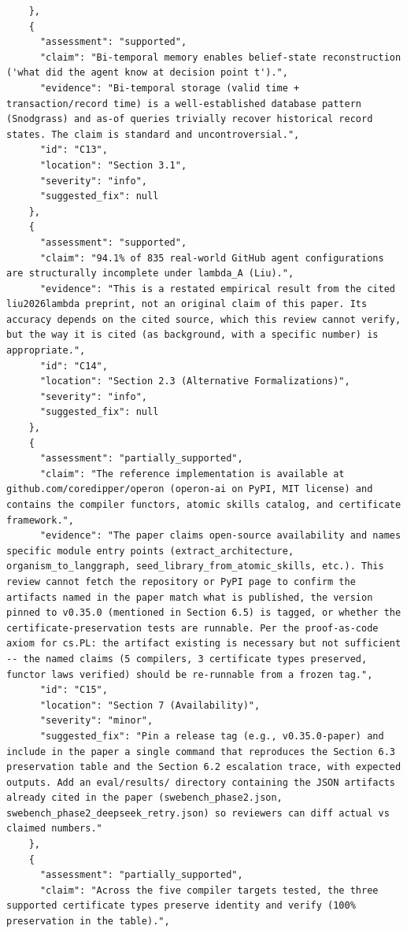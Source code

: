 \documentclass[11pt]{article}
\begin{document}
\begin{verbatim}
    },
    {
      "assessment": "supported",
      "claim": "Bi-temporal memory enables belief-state reconstruction ('what did the agent know at decision point t').",
      "evidence": "Bi-temporal storage (valid time + transaction/record time) is a well-established database pattern (Snodgrass) and as-of queries trivially recover historical record states. The claim is standard and uncontroversial.",
      "id": "C13",
      "location": "Section 3.1",
      "severity": "info",
      "suggested_fix": null
    },
    {
      "assessment": "supported",
      "claim": "94.1% of 835 real-world GitHub agent configurations are structurally incomplete under lambda_A (Liu).",
      "evidence": "This is a restated empirical result from the cited liu2026lambda preprint, not an original claim of this paper. Its accuracy depends on the cited source, which this review cannot verify, but the way it is cited (as background, with a specific number) is appropriate.",
      "id": "C14",
      "location": "Section 2.3 (Alternative Formalizations)",
      "severity": "info",
      "suggested_fix": null
    },
    {
      "assessment": "partially_supported",
      "claim": "The reference implementation is available at github.com/coredipper/operon (operon-ai on PyPI, MIT license) and contains the compiler functors, atomic skills catalog, and certificate framework.",
      "evidence": "The paper claims open-source availability and names specific module entry points (extract_architecture, organism_to_langgraph, seed_library_from_atomic_skills, etc.). This review cannot fetch the repository or PyPI page to confirm the artifacts named in the paper match what is published, the version pinned to v0.35.0 (mentioned in Section 6.5) is tagged, or whether the certificate-preservation tests are runnable. Per the proof-as-code axiom for cs.PL: the artifact existing is necessary but not sufficient -- the named claims (5 compilers, 3 certificate types preserved, functor laws verified) should be re-runnable from a frozen tag.",
      "id": "C15",
      "location": "Section 7 (Availability)",
      "severity": "minor",
      "suggested_fix": "Pin a release tag (e.g., v0.35.0-paper) and include in the paper a single command that reproduces the Section 6.3 preservation table and the Section 6.2 escalation trace, with expected outputs. Add an eval/results/ directory containing the JSON artifacts already cited in the paper (swebench_phase2.json, swebench_phase2_deepseek_retry.json) so reviewers can diff actual vs claimed numbers."
    },
    {
      "assessment": "partially_supported",
      "claim": "Across the five compiler targets tested, the three supported certificate types preserve identity and verify (100% preservation in the table).",

\end{verbatim}
\end{document}
